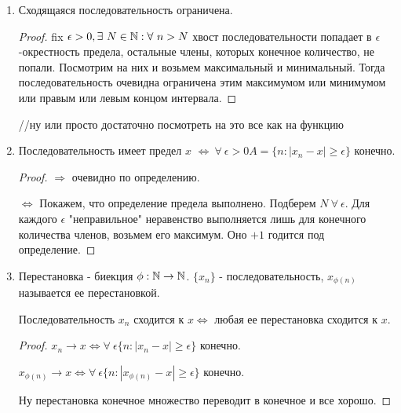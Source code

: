 \documentclass[12pt]{report}
\begin{document}
\begin{prop}

\begin{enumerate}
\item Сходящаяся последовательность ограничена. 
\begin{proof}
fix $\epsilon > 0, \exists ~N \in \mathbb{N}: \forall ~n > N$ хвост последовательности попадает в $\epsilon$-окрестность предела, остальные члены, которых конечное количество, не попали. Посмотрим на них и возьмем максимальный и минимальный. Тогда последовательность очевидна ограничена этим максимумом или минимумом или правым или левым концом интервала.
\end{proof}

//ну или просто достаточно посмотреть на это все как на функцию
\item

\begin{lm}
Последовательность имеет предел $x$ $\Leftrightarrow ~\forall ~\epsilon > 0 A = \{n: |x_n - x| \ge \epsilon\}$ конечно.
\end{lm}
\begin{proof}
$\Rightarrow$ очевидно по определению.

$\Leftrightarrow$ Покажем, что определение предела выполнено. Подберем $N ~\forall ~\epsilon$. Для каждого $\epsilon$ "неправильное" неравенство выполняется лишь для конечного количества членов, возьмем его максимум. Оно $+1$ годится под определение.
\end{proof}

\item
\begin{defn}
Перестановка - биекция $\phi: \mathbb{N} \to \mathbb{N}$. $\{x_n\}$ - последовательность, $x_{\phi (n)}$ называется ее перестановкой.
\end{defn}
\begin{thm}
Последовательность $x_n$ сходится к $x \Leftrightarrow$ любая ее перестановка сходится к $x$.
\end{thm}
\begin{proof}
$x_n \to x \Leftrightarrow \forall ~\epsilon \{n: |x_n - x| \ge \epsilon\}$ конечно.


$x_{\phi (n)} \to x \Leftrightarrow \forall ~\epsilon \{n: |x_{\phi (n)} - x| \ge \epsilon\}$ конечно.

Ну перестановка конечное множество переводит в конечное и все хорошо.
\end{proof}
\end{enumerate}
\end{prop}
\end{document}
